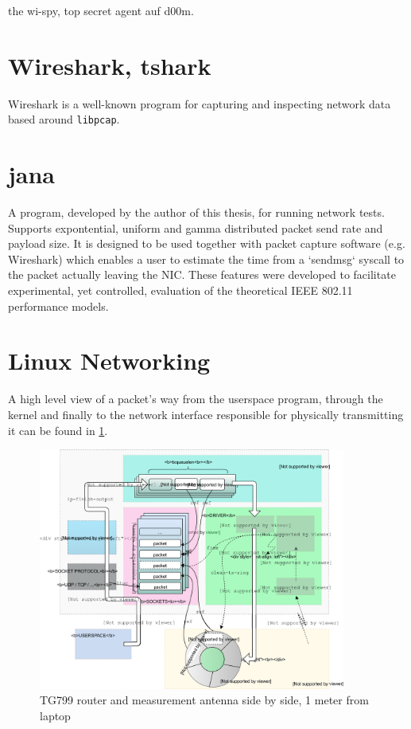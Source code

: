 the wi-spy, top secret agent auf d00m.

\section{Wireshark, tshark}

Wireshark is a well-known program for capturing and inspecting network data
based around \texttt{libpcap}.

\section{jana}

A program, developed by the author of this thesis, for running network tests.
Supports expontential, uniform and gamma distributed packet send rate and
payload size. It is designed to be used together with packet capture software
(e.g. Wireshark) which enables a user to estimate the time from a `sendmsg`
syscall to the packet actually leaving the NIC. These features were developed
to facilitate experimental, yet controlled, evaluation of the theoretical IEEE
802.11 performance models.

\section{Linux Networking}

A high level view of a packet's way from the userspace program, through the
kernel and finally to the network interface responsible for physically
transmitting it can be found in \ref{fig:linux_egress}.

\begin{figure}
\center
\includegraphics[width=0.9\textwidth]{images/linux-egress-overview.eps}
\caption{TG799 router and measurement antenna side by side, 1 meter from laptop}
\label{fig:linux_egress}
\end{figure}
